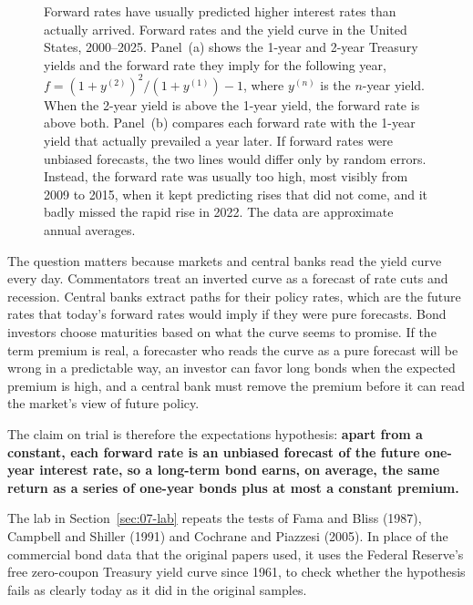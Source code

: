 \begin{figure}[htbp]
{%
}
\caption{Forward rates have usually predicted higher interest rates than actually arrived. Forward rates and the yield curve in the United States, 2000--2025. Panel~(a) shows the 1-year and 2-year Treasury yields and the forward rate they imply for the following year, $f = (1 + y^{(2)})^2 / (1 + y^{(1)}) - 1$, where $y^{(n)}$ is the $n$-year yield. When the 2-year yield is above the 1-year yield, the forward rate is above both. Panel~(b) compares each forward rate with the 1-year yield that actually prevailed a year later. If forward rates were unbiased forecasts, the two lines would differ only by random errors. Instead, the forward rate was usually too high, most visibly from 2009 to 2015, when it kept predicting rises that did not come, and it badly missed the rapid rise in 2022. The data are approximate annual averages.}
\label{fig:07-forward2}
\end{figure}



The question matters because markets and central banks read the yield curve every day. Commentators treat an inverted curve as a forecast of rate cuts and recession. Central banks extract  paths for their policy rates, which are the future rates that today's forward rates would imply if they were pure forecasts. Bond investors choose maturities based on what the curve seems to promise. If the term premium is real, a forecaster who reads the curve as a pure forecast will be wrong in a predictable way, an investor can favor long bonds when the expected premium is high, and a central bank must remove the premium before it can read the market's view of future policy.

The claim on trial is therefore the expectations hypothesis: \textbf{apart from a constant, each forward rate is an unbiased forecast of the future one-year interest rate, so a long-term bond earns, on average, the same return as a series of one-year bonds plus at most a constant premium.}

The lab in Section~\ref{sec:07-lab} repeats the tests of Fama and Bliss (1987), Campbell and Shiller (1991) and Cochrane and Piazzesi (2005). In place of the commercial bond data that the original papers used, it uses the Federal Reserve's free zero-coupon Treasury yield curve since 1961, to check whether the hypothesis fails as clearly today as it did in the original samples.

